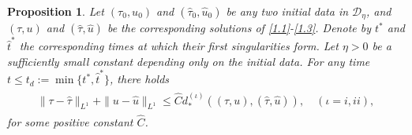 \documentclass[11pt,reqno]{article}
\newtheorem{prop}{Proposition}
\numberwithin{equation}{section}
\begin{document}
\begin{prop}\label{prop3}
Let $(\tau_0, u_0)$ and $(\hat{\tau}_0, \hat{u}_0)$ be any two initial data
in $\mathcal{D}_\eta$, and $(\tau, u)$ and $(\hat{\tau}, \hat{u})$ be the corresponding solutions of \eqref{1.1}-\eqref{1.3}. Denote by $t^*$ and $\hat{t}^*$ the corresponding times at which their first singularities form. Let $\eta>0$ be a sufficiently small constant depending only on the initial data.
For any time $t\leq t_d:=\min\{t^*, \hat{t}^*\}$, there holds
\begin{align}\label{7.41}
\begin{split}
\|\tau-\hat{\tau}\|_{L^1} + \|u-\hat{u}\|_{L^1}
\leq \widehat{C} d_{*}^{(\iota)}((\tau, u), (\hat{\tau}, \hat{u})),\quad (\iota=i, ii),
\end{split}
\end{align}
for some positive constant $\widehat{C}$.
\end{prop}
\end{document}

